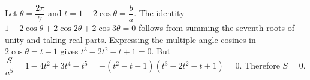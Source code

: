 Let $\theta = \dfrac{2 \pi}{7}$ and $t = 1 + 2 \cos \theta = \dfrac{b}{a}$. The identity $1+2\cos\theta+2\cos2\theta+2\cos3\theta=0$ follows from summing the seventh roots of unity and taking real parts. Expressing the multiple-angle cosines in $2\cos\theta=t-1$ gives $t^3-2t^2-t+1=0$. But $\dfrac{S}{a^5} = 1 - 4 t^2 + 3 t^4 - t^5 = - (t^2-t-1) (t^3-2t^2-t+1) = 0$. Therefore $\boxed{S=0}$.
